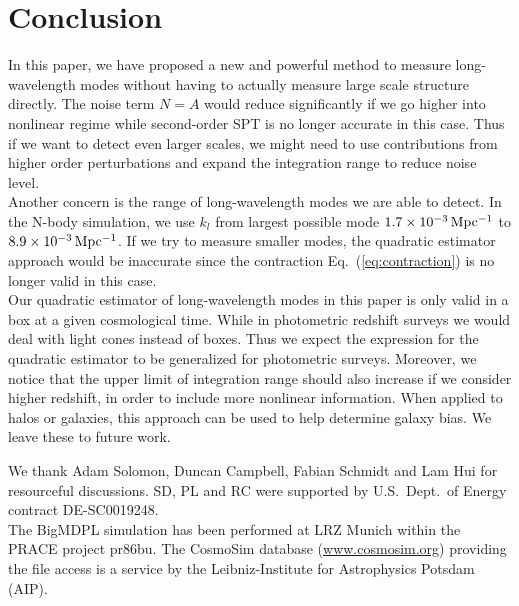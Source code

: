\documentclass[prd,amsmath,amssymb,floatfix,superscriptaddress,nofootinbib,twocolumn]{revtex4-1}
\newcommand{\ec}[1]{Eq.~(\ref{eq:#1})}
\begin{document}
\section{Conclusion}\label{sec4}
In this paper, we have proposed a new and powerful method to measure long-wavelength modes without having to actually measure large scale structure directly. The noise term $N=A$ would reduce significantly if we go higher into nonlinear regime while second-order SPT is no longer accurate in this case. Thus if we want to detect even larger scales, we might need to use contributions from higher order perturbations and expand the integration range to reduce noise level. \\
Another concern is the range of long-wavelength modes we are able to detect. In the N-body simulation, we use $k_l$ from largest possible mode $1.7 \times 10^{-3} \, \rm Mpc^{-1}$ to $8.9\times 10^{-3} \, \rm Mpc^{-1}$. If we try to measure smaller modes, the quadratic estimator approach would be inaccurate since the contraction \ec{contraction} is no longer valid in this case.\\
Our quadratic estimator of long-wavelength modes in this paper is only valid in a box at a given cosmological time. While in photometric redshift surveys we would deal with light cones instead of boxes. Thus we expect the expression for the quadratic estimator to be generalized for photometric surveys. Moreover, we notice that the upper limit of integration range should also increase if we consider higher redshift, in order to include more nonlinear information. When applied to halos or galaxies, this approach can be used to help determine galaxy bias. We leave these to future work.

\acknowledgements
\noindent We thank Adam Solomon, Duncan Campbell, Fabian Schmidt and Lam Hui for resourceful discussions.  SD, PL and RC were supported by U.S.\ Dept.\ of Energy contract DE-SC0019248.\\
The BigMDPL simulation has been performed at LRZ Munich within the PRACE project pr86bu. The CosmoSim database (\url{www.cosmosim.org}) providing the file access is a service by the Leibniz-Institute for Astrophysics Potsdam (AIP).
%

\end{document}
